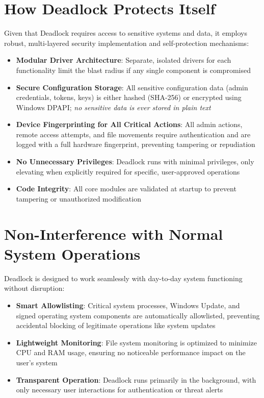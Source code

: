 \documentclass[12pt,letterpaper]{report}
\begin{document}
\section{How Deadlock Protects Itself}
Given that Deadlock requires access to sensitive systems and data, it employs robust, multi-layered security implementation and self-protection mechanisms:
\begin{itemize}
    \item \textbf{Modular Driver Architecture}: Separate, isolated drivers for each functionality limit the blast radius if any single component is compromised
    \item \textbf{Secure Configuration Storage}: All sensitive configuration data (admin credentials, tokens, keys) is either hashed (SHA-256) or encrypted using Windows DPAPI; \textit{no sensitive data is ever stored in plain text}
    \item \textbf{Device Fingerprinting for All Critical Actions}: All admin actions, remote access attempts, and file movements require authentication and are logged with a full hardware fingerprint, preventing tampering or repudiation
    \item \textbf{No Unnecessary Privileges}: Deadlock runs with minimal privileges, only elevating when explicitly required for specific, user-approved operations
    \item \textbf{Code Integrity}: All core modules are validated at startup to prevent tampering or unauthorized modification
\end{itemize}

\section{Non-Interference with Normal System Operations}
Deadlock is designed to work seamlessly with day-to-day system functioning without disruption:
\begin{itemize}
    \item \textbf{Smart Allowlisting}: Critical system processes, Windows Update, and signed operating system components are automatically allowlisted, preventing accidental blocking of legitimate operations like system updates
    \item \textbf{Lightweight Monitoring}: File system monitoring is optimized to minimize CPU and RAM usage, ensuring no noticeable performance impact on the user's system
    \item \textbf{Transparent Operation}: Deadlock runs primarily in the background, with only necessary user interactions for authentication or threat alerts
\end{itemize}
\end{document}
